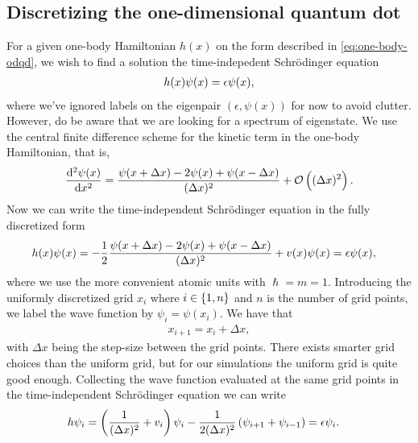     \subsection{Discretizing the one-dimensional quantum dot}
        \label{subsec:discretizing-the-odqd}
        For a given one-body Hamiltonian $h(x)$ on the form described in
        \autoref{eq:one-body-odqd}, we wish to find a solution the
        time-indepedent Schrödinger equation
        \begin{align}
            h(x)\psi(x) = \epsilon \psi(x),
        \end{align}
        where we've ignored labels on the eigenpair $(\epsilon, \psi(x))$ for
        now to avoid clutter.
        However, do be aware that we are looking for a spectrum of eigenstate.
        We use the central finite difference scheme for the kinetic term in the
        one-body Hamiltonian, that is,
        \begin{align}
            \dod[2]{\psi(x)}{x}
            = \frac{
                \psi(x + \Delta x) - 2\psi(x) + \psi(x - \Delta x)
            }{(\Delta x)^2}
            + \mathcal{O}\para{(\Delta x)^2}.
        \end{align}
        Now we can write the time-independent Schrödinger equation in the fully
        discretized form
        \begin{align}
            h(x) \psi(x)
            &= -\frac{1}{2}
            \frac{
                \psi(x + \Delta x) - 2\psi(x) + \psi(x - \Delta x)
            }{(\Delta x)^2}
            + v(x)\psi(x)
            = \epsilon \psi(x),
        \end{align}
        where we use the more convenient atomic units with $\hslash = m = 1$.
        Introducing the uniformly discretized grid $x_i$ where $i \in \left\{ 1,
        n \right\}$ and $n$ is the number of grid points, we label the wave function by
        $\psi_i = \psi(x_i)$.
        We have that
        \begin{align}
            x_{i + 1} = x_i + \Delta x,
        \end{align}
        with $\Delta x$ being the step-size between the grid points.
        There exists smarter grid choices than the uniform grid, but for our
        simulations the uniform grid is quite good enough.
        Collecting the wave function evaluated at the same grid points in the
        time-independent Schrödinger equation we can write
        \begin{align}
            h \psi_i
            &=
            \left( 
                \frac{1}{(\Delta x)^2}
                + v_i
             \right)\psi_i
            - \frac{1}{2 (\Delta x)^2}
            \left( 
                \psi_{i + 1}
                + \psi_{i - 1}
             \right)
            = \epsilon \psi_i.
        \end{align}
